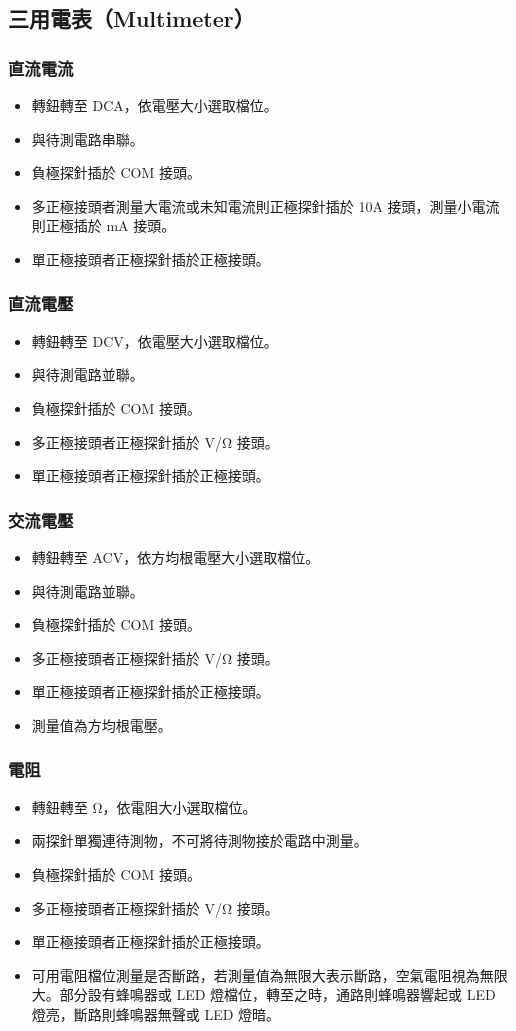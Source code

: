\documentclass[a4paper,12pt]{report}
\begin{document}
\begin{itemize}
\subsection{三用電表（Multimeter）}
\subsubsection{直流電流}
\begin{itemize}
\item 轉鈕轉至 DCA，依電壓大小選取檔位。
\item 與待測電路串聯。
\item 負極探針插於 COM 接頭。
\item 多正極接頭者測量大電流或未知電流則正極探針插於 10A 接頭，測量小電流則正極插於 mA 接頭。
\item 單正極接頭者正極探針插於正極接頭。
\end{itemize}
\subsubsection{直流電壓}
\begin{itemize}
\item 轉鈕轉至 DCV，依電壓大小選取檔位。
\item 與待測電路並聯。
\item 負極探針插於 COM 接頭。
\item 多正極接頭者正極探針插於 V/Ω 接頭。
\item 單正極接頭者正極探針插於正極接頭。
\end{itemize}
\subsubsection{交流電壓}
\begin{itemize}
\item 轉鈕轉至 ACV，依方均根電壓大小選取檔位。
\item 與待測電路並聯。
\item 負極探針插於 COM 接頭。
\item 多正極接頭者正極探針插於 V/Ω 接頭。
\item 單正極接頭者正極探針插於正極接頭。
\item 測量值為方均根電壓。
\end{itemize}
\subsubsection{電阻}
\begin{itemize}
\item 轉鈕轉至 Ω，依電阻大小選取檔位。
\item 兩探針單獨連待測物，不可將待測物接於電路中測量。
\item 負極探針插於 COM 接頭。
\item 多正極接頭者正極探針插於 V/Ω 接頭。
\item 單正極接頭者正極探針插於正極接頭。
\item 可用電阻檔位測量是否斷路，若測量值為無限大表示斷路，空氣電阻視為無限大。部分設有蜂鳴器或 LED 燈檔位，轉至之時，通路則蜂鳴器響起或 LED 燈亮，斷路則蜂鳴器無聲或 LED 燈暗。
\end{itemize}

\end{itemize}
\end{document}
